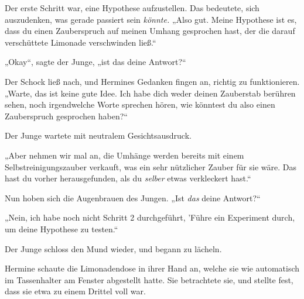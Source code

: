 Der erste Schritt war, eine Hypothese aufzustellen. Das bedeutete, sich auszudenken, was gerade passiert sein \emph{könnte.} „Also gut. Meine Hypothese ist es, dass du einen Zauberspruch auf meinen Umhang gesprochen hast, der die darauf verschüttete Limonade verschwinden ließ.“

„Okay“, sagte der Junge, „ist das deine Antwort?“

Der Schock ließ nach, und Hermines Gedanken fingen an, richtig zu funktionieren. „Warte, das ist keine gute Idee. Ich habe dich weder deinen Zauberstab berühren sehen, noch irgendwelche Worte sprechen hören, wie könntest du also einen Zauberspruch gesprochen haben?“

Der Junge wartete mit neutralem Gesichtsausdruck.

„Aber nehmen wir mal an, die Umhänge werden bereits mit einem Selbstreinigungszauber verkauft, was ein sehr nützlicher Zauber für sie wäre. Das hast du vorher herausgefunden, als du \emph{selber} etwas verkleckert hast.“

Nun hoben sich die Augenbrauen des Jungen. „Ist \emph{das} deine Antwort?“

„Nein, ich habe noch nicht Schritt 2 durchgeführt, 'Führe ein Experiment durch, um deine Hypothese zu testen.“

Der Junge schloss den Mund wieder, und begann zu lächeln.

Hermine schaute die Limonadendose in ihrer Hand an, welche sie wie automatisch im Tassenhalter am Fenster abgestellt hatte. Sie betrachtete sie, und stellte fest, dass sie etwa zu einem Drittel voll war.

